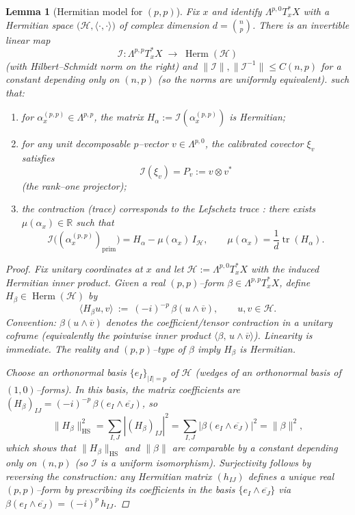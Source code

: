 \documentclass[11pt]{article}
\newcommand{\REVMZ}[1]{\textcolor{teal}{#1}}  %
\numberwithin{equation}{section}  %
\theoremstyle{plain}
\newtheorem{lemma}[theorem]{Lemma}
\theoremstyle{definition}
\theoremstyle{remark}
\newcommand{\R}{\mathbb{R}}
\DeclareMathOperator{\Herm}{Herm}
\begin{document}
\begin{lemma}[Hermitian model for $(p,p)$]\label{lem:hermitian-model}
	Fix $x$ and identify $\Lambda^{p,0}T_x^{*}X$ with a Hermitian space 
	$\bigl(\mathcal{H},\langle\cdot,\cdot\rangle\bigr)$ of complex dimension 
	$d=\binom{n}{p}$.  
	There is an invertible linear map
	\[
	\mathcal{I} : \Lambda^{p,p}T_x^{*}X \;\longrightarrow\; \Herm(\mathcal{H})
	\]
	(with Hilbert--Schmidt norm on the right)
	and $\|\mathcal{I}\|,\|\mathcal{I}^{-1}\|\le C(n,p)$ for a constant depending only on $(n,p)$ (so the norms are uniformly equivalent). such that:
	\begin{enumerate}
		\item for $\alpha_x^{(p,p)}\in\Lambda^{p,p}$, the matrix 
		$H_\alpha := \mathcal{I}(\alpha_x^{(p,p)})$ is Hermitian;
		
		\item for any unit decomposable $p$--vector $v\in\Lambda^{p,0}$,  
		the calibrated covector $\xi_v$ satisfies
		\[
		\mathcal{I}(\xi_v) = P_v := v\otimes v^{*}
		\]
		(the rank--one projector);
		
		\item the contraction (trace) corresponds to the Lefschetz trace \REVMZ{\cite{GH78}}:  
		there exists $\mu(\alpha_x)\in\R$ such that
		\[
		\mathcal{I}\bigl( (\alpha_x^{(p,p)})_{\mathrm{prim}} \bigr)
		=
		H_\alpha - \mu(\alpha_x)\, I_{\mathcal{H}},
		\qquad
		\mu(\alpha_x) = \frac{1}{d}\operatorname{tr}(H_\alpha).
		\]
	\end{enumerate}

\begin{proof}
Fix unitary coordinates at $x$ and let $\mathcal H:=\Lambda^{p,0}T_x^*X$ with the induced Hermitian inner product.
Given a real $(p,p)$--form $\beta\in\Lambda^{p,p}T_x^*X$, define $H_\beta\in\Herm(\mathcal H)$ by
\[
\langle H_\beta u, v\rangle\ :=\ {(-i)^{-p}}\,\beta(u\wedge \overline{v}),
\qquad u,v\in\mathcal H.
\]
{\emph{Convention:} \(\beta(u\wedge\overline v)\) denotes the coefficient/tensor contraction in a unitary coframe (equivalently the pointwise inner product \(\langle \beta,\,u\wedge\overline v\rangle\)).}
Linearity is immediate.  The reality and $(p,p)$--type of $\beta$ imply $H_\beta$ is Hermitian.

Choose an orthonormal basis $\{e_I\}_{|I|=p}$ of $\mathcal H$ (wedges of an orthonormal basis of $(1,0)$--forms).  In this basis,
the matrix coefficients are $ (H_\beta)_{IJ}={(-i)^{-p}}\,\beta(e_I\wedge\overline{e_J}) $, so
\[
\|H_\beta\|_{\mathrm{HS}}^2=\sum_{I,J} |(H_\beta)_{IJ}|^2=\sum_{I,J}|\beta(e_I\wedge\overline{e_J})|^2=\|\beta\|^2,
\]
which shows that $\|H_\beta\|_{\mathrm{HS}}$ and $\|\beta\|$ are comparable by a constant depending only on $(n,p)$ (so $\mathcal I$ is a uniform isomorphism).
Surjectivity follows by reversing the construction: any Hermitian matrix $(h_{IJ})$ defines a unique real $(p,p)$--form by prescribing
its coefficients in the basis $\{e_I\wedge\overline{e_J}\}$ via $\beta(e_I\wedge\overline{e_J})={(-i)^p}\,h_{IJ}$.


\end{proof}
\end{lemma}
\end{document}

